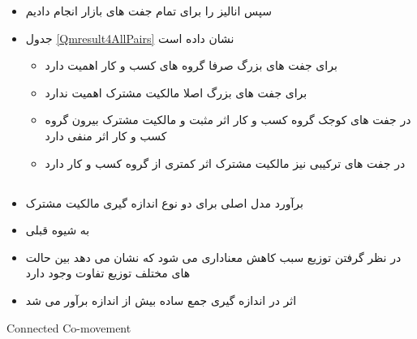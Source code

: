 \documentclass[12pt, a4paper]{article}
\begin{document}
\begin{itemize}
\begin{itemize}
	\end{itemize}
	\item
	سپس انالیز را برای تمام  جفت های بازار  انجام دادیم
	\item
	جدول  
	\ref{Qmresult4AllPairs}
	نشان داده است
	\begin{LTR}
	\end{LTR}
	\begin{itemize}
	\item 
	برای جفت های بزرگ صرفا گروه های کسب و کار اهمیت دارد 
	\item 
	برای جفت های بزرگ اصلا مالکیت مشترک اهمیت ندارد
	\item 
	در جفت های کوجک گروه کسب و کار اثر مثبت و مالکیت مشترک بیرون گروه کسب و کار اثر منفی دارد 
	\item
	در جفت های ترکیبی نیز مالکیت مشترک اثر کمتری از گروه کسب و کار دارد
	
\end{itemize}
\end{itemize}
		


	
	





\FloatBarrier

\subsection{}
\begin{itemize}
	\item 
	برآورد مدل اصلی برای دو نوع اندازه گیری مالکیت مشترک
	\item 
	به شیوه قبلی
	\item 
	در نظر گرفتن توزیع سبب کاهش معناداری می شود که نشان می دهد بین حالت های مختلف توزیع تفاوت وجود دارد
	\item
	اثر در اندازه گیری جمع ساده بیش از اندازه برآور می شد
	
\end{itemize}

{\begin{table}[htbp]
		\caption{Connected Co-movement}
		\label{mresult2Polk}
		\resizebox{1\textwidth}{!}{
			\begin{LTR}
				\lr{}
			\end{LTR}
		}
\end{table}}
\end{document}
